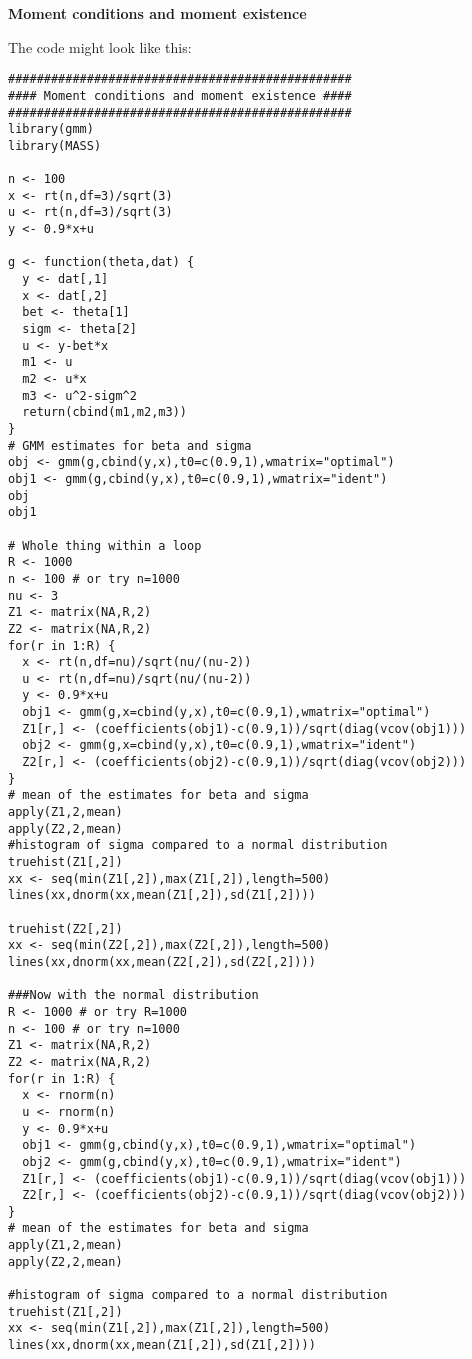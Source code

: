 \documentclass{article}
\begin{document}
\begin{solution}
\textbf{Moment conditions and moment existence }

The code might look like this:
\begin{verbatim}
################################################
#### Moment conditions and moment existence ####
################################################
library(gmm)
library(MASS)

n <- 100
x <- rt(n,df=3)/sqrt(3)
u <- rt(n,df=3)/sqrt(3)
y <- 0.9*x+u

g <- function(theta,dat) {
  y <- dat[,1]
  x <- dat[,2]
  bet <- theta[1]
  sigm <- theta[2]
  u <- y-bet*x
  m1 <- u
  m2 <- u*x
  m3 <- u^2-sigm^2
  return(cbind(m1,m2,m3))
}
# GMM estimates for beta and sigma
obj <- gmm(g,cbind(y,x),t0=c(0.9,1),wmatrix="optimal")
obj1 <- gmm(g,cbind(y,x),t0=c(0.9,1),wmatrix="ident")
obj
obj1

# Whole thing within a loop
R <- 1000
n <- 100 # or try n=1000
nu <- 3
Z1 <- matrix(NA,R,2)
Z2 <- matrix(NA,R,2)
for(r in 1:R) {
  x <- rt(n,df=nu)/sqrt(nu/(nu-2))
  u <- rt(n,df=nu)/sqrt(nu/(nu-2))
  y <- 0.9*x+u
  obj1 <- gmm(g,x=cbind(y,x),t0=c(0.9,1),wmatrix="optimal")
  Z1[r,] <- (coefficients(obj1)-c(0.9,1))/sqrt(diag(vcov(obj1)))
  obj2 <- gmm(g,x=cbind(y,x),t0=c(0.9,1),wmatrix="ident")
  Z2[r,] <- (coefficients(obj2)-c(0.9,1))/sqrt(diag(vcov(obj2)))
}
# mean of the estimates for beta and sigma
apply(Z1,2,mean)
apply(Z2,2,mean)
#histogram of sigma compared to a normal distribution
truehist(Z1[,2])
xx <- seq(min(Z1[,2]),max(Z1[,2]),length=500)
lines(xx,dnorm(xx,mean(Z1[,2]),sd(Z1[,2])))

truehist(Z2[,2])
xx <- seq(min(Z2[,2]),max(Z2[,2]),length=500)
lines(xx,dnorm(xx,mean(Z2[,2]),sd(Z2[,2])))

###Now with the normal distribution
R <- 1000 # or try R=1000
n <- 100 # or try n=1000
Z1 <- matrix(NA,R,2)
Z2 <- matrix(NA,R,2)
for(r in 1:R) {
  x <- rnorm(n)
  u <- rnorm(n)
  y <- 0.9*x+u
  obj1 <- gmm(g,cbind(y,x),t0=c(0.9,1),wmatrix="optimal")
  obj2 <- gmm(g,cbind(y,x),t0=c(0.9,1),wmatrix="ident")
  Z1[r,] <- (coefficients(obj1)-c(0.9,1))/sqrt(diag(vcov(obj1)))
  Z2[r,] <- (coefficients(obj2)-c(0.9,1))/sqrt(diag(vcov(obj2)))
}
# mean of the estimates for beta and sigma
apply(Z1,2,mean)
apply(Z2,2,mean)

#histogram of sigma compared to a normal distribution
truehist(Z1[,2])
xx <- seq(min(Z1[,2]),max(Z1[,2]),length=500)
lines(xx,dnorm(xx,mean(Z1[,2]),sd(Z1[,2])))


\end{verbatim}
\end{solution}
\end{document}
